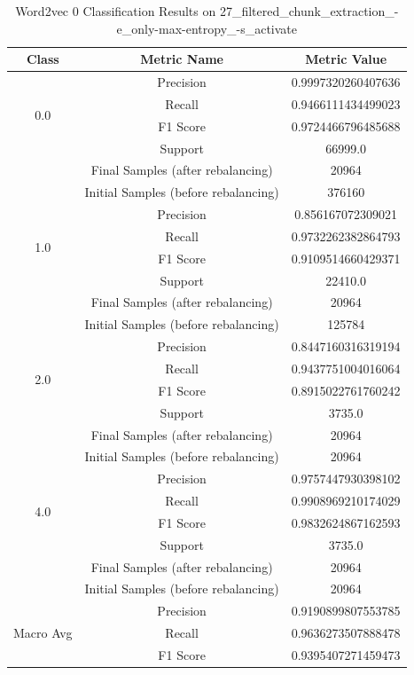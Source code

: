 \begin{longtable}{|c|c|c|}
\caption{Word2vec 0 Classification Results on 27\_filtered\_chunk\_extraction\_-e\_only-max-entropy\_-s\_activate} \label{tab:27_filtered_chunk_extraction_-e_only-max-entropy_-s_activate_word2vec_0_classifiers_results} \\
\hline
Class & Metric Name & Metric Value \\
\hline
\multirow{4}{*}{0.0} & Precision & 0.9997320260407636 \\
 & Recall & 0.9466111434499023 \\
 & F1 Score & 0.9724466796485688 \\
 & Support & 66999.0 \\
 & Final Samples (after rebalancing) & 20964 \\
 & Initial Samples (before rebalancing) & 376160 \\
\hline
\multirow{4}{*}{1.0} & Precision & 0.856167072309021 \\
 & Recall & 0.9732262382864793 \\
 & F1 Score & 0.9109514660429371 \\
 & Support & 22410.0 \\
 & Final Samples (after rebalancing) & 20964 \\
 & Initial Samples (before rebalancing) & 125784 \\
\hline
\multirow{4}{*}{2.0} & Precision & 0.8447160316319194 \\
 & Recall & 0.9437751004016064 \\
 & F1 Score & 0.8915022761760242 \\
 & Support & 3735.0 \\
 & Final Samples (after rebalancing) & 20964 \\
 & Initial Samples (before rebalancing) & 20964 \\
\hline
\multirow{4}{*}{4.0} & Precision & 0.9757447930398102 \\
 & Recall & 0.9908969210174029 \\
 & F1 Score & 0.9832624867162593 \\
 & Support & 3735.0 \\
 & Final Samples (after rebalancing) & 20964 \\
 & Initial Samples (before rebalancing) & 20964 \\
\hline
\multirow{4}{*}{Macro Avg} & Precision & 0.9190899807553785 \\
 & Recall & 0.9636273507888478 \\
 & F1 Score & 0.9395407271459473 \\

\end{longtable}
